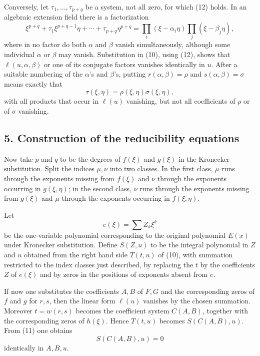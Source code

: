 \documentclass[11pt]{article}
\begin{document}
Conversely, let $\tau_1,\ldots,\tau_{p+q}$ be a system, not all zero, for which (12) holds. In an algebraic extension field there is a factorization
\[
  \xi^{p+q}+\tau_1\xi^{p+q-1}\eta+\cdots+\tau_{p+q}\eta^{p+q}
  =\prod_i(\xi-\alpha_i\eta)\prod_j(\xi-\beta_j\eta),
\]
where in no factor do both $\alpha$ and $\beta$ vanish simultaneously, although some individual $\alpha$ or $\beta$ may vanish. Substitution in (10), using (12), shows that $\ell(u,\alpha,\beta)$ or one of its conjugate factors vanishes identically in $u$. After a suitable numbering of the $\alpha$'s and $\beta$'s, putting $r(\alpha,\beta)=\rho$ and $s(\alpha,\beta)=\sigma$ means exactly that
\begin{equation}
  \tau(\xi,\eta)=\rho(\xi,\eta)\sigma(\xi,\eta),                    \tag{13}
\end{equation}
with all products that occur in $\ell(u)$ vanishing, but not all coefficients of $\rho$ or of $\sigma$ vanishing.

\subsection*{5. Construction of the reducibility equations}

Now take $p$ and $q$ to be the degrees of $f(\xi)$ and $g(\xi)$ in the Kronecker substitution. Split the indices $\mu,\nu$ into two classes. In the first class, $\mu$ runs through the exponents missing from $f(\xi)$ and $\nu$ through the exponents occurring in $g(\xi,\eta)$; in the second class, $\nu$ runs through the exponents missing from $g(\xi)$ and $\mu$ through the exponents occurring in $f(\xi,\eta)$.

Let
\[
  e(\xi)=\sum Z_k\xi^k
\]
be the one-variable polynomial corresponding to the original polynomial $E(x)$ under Kronecker substitution. Define $S(Z,u)$ to be the integral polynomial in $Z$ and $u$ obtained from the right hand side $T(t,u)$ of (10), with summation restricted to the index classes just described, by replacing the $t$ by the coefficients $Z$ of $e(\xi)$ and by zeros in the positions of exponents absent from $e$.

If now one substitutes the coefficients $A,B$ of $F,G$ and the corresponding zeros of $f$ and $g$ for $r,s$, then the linear form $\ell(u)$ vanishes by the chosen summation. Moreover $t=w(r,s)$ becomes the coefficient system $C(A,B)$, together with the corresponding zeros of $h(\xi)$. Hence $T(t,u)$ becomes $S(C(A,B),u)$. From (11) one obtains
\begin{equation}
  S(C(A,B),u)=0                                                   \tag{14}
\end{equation}
identically in $A,B,u$.
\end{document}
